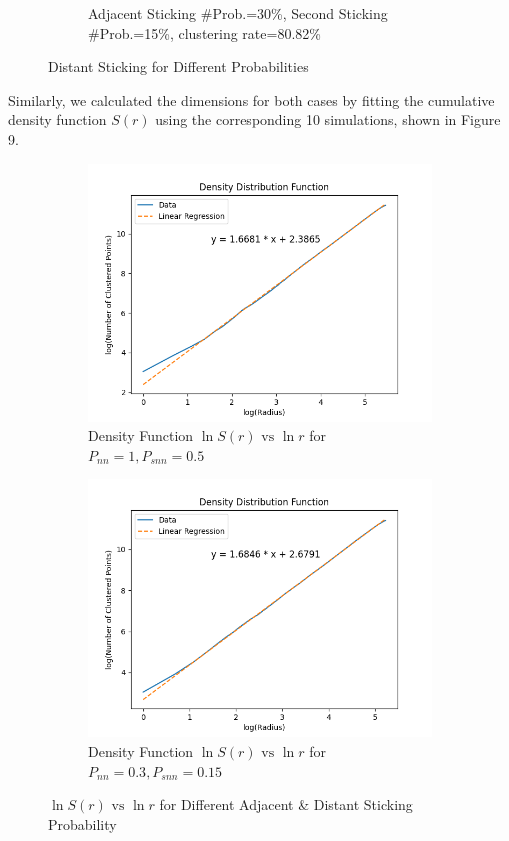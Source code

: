 \documentclass[10pt]{article}
\begin{document}
\begin{figure}[h]
\begin{subfigure}[b]{0.3\textwidth}
		\caption{Adjacent Sticking \#Prob.=30\%, Second Sticking \#Prob.=15\%, clustering rate=80.82\%}
	\end{subfigure}
	\caption{Distant Sticking for Different Probabilities}
\end{figure}

Similarly, we calculated the dimensions for both cases by fitting the cumulative density function $S(r)$ using the corresponding 10 simulations, shown in Figure 9.

\begin{figure}[h]
	\centering
	\begin{subfigure}[b]{0.3\textwidth}
		\centering
		\includegraphics[width=\textwidth]{Figure_8}
		\caption{Density Function $\ln S(r) \text{ vs } \ln r$ for $P_{nn} = 1, P_{snn} = 0.5$}
	\end{subfigure}
	\begin{subfigure}[b]{0.3\textwidth}
		\centering
		\includegraphics[width=\textwidth]{Figure_9}
		\caption{Density Function $\ln S(r) \text{ vs } \ln r$ for $P_{nn} = 0.3, P_{snn} = 0.15$}
	\end{subfigure}
	\caption{$\ln S(r) \text{ vs } \ln r$ for Different Adjacent \& Distant Sticking Probability}
\end{figure}
\end{document}
